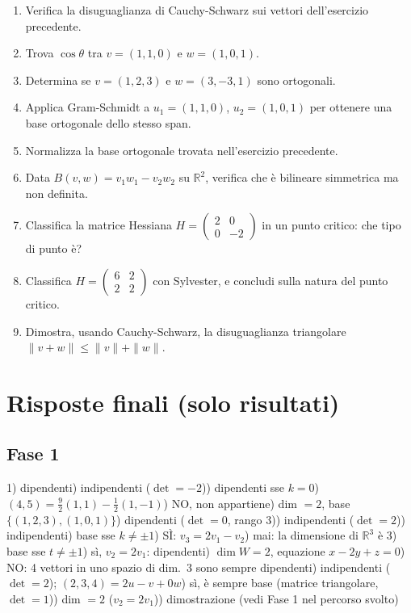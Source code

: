 \documentclass[a4paper,11pt]{article}
\begin{document}
\begin{enumerate}
  \item Verifica la disuguaglianza di Cauchy-Schwarz sui vettori dell'esercizio precedente.
  \item Trova $\cos\theta$ tra $v=(1,1,0)$ e $w=(1,0,1)$.
  \item Determina se $v=(1,2,3)$ e $w=(3,-3,1)$ sono ortogonali.
  \item Applica Gram-Schmidt a $u_1=(1,1,0)$, $u_2=(1,0,1)$ per ottenere una base ortogonale dello stesso span.
  \item Normalizza la base ortogonale trovata nell'esercizio precedente.
  \item Data $B(v,w)=v_1w_1-v_2w_2$ su $\mathbb R^2$, verifica che è bilineare simmetrica ma non definita.
  \item Classifica la matrice Hessiana $H=\begin{pmatrix}2&0\\0&-2\end{pmatrix}$ in un punto critico: che tipo di punto è?
  \item Classifica $H=\begin{pmatrix}6&2\\2&2\end{pmatrix}$ con Sylvester, e concludi sulla natura del punto critico.
  \item Dimostra, usando Cauchy-Schwarz, la disuguaglianza triangolare $\|v+w\|\le\|v\|+\|w\|$.
\end{enumerate}

\newpage
\section*{Risposte finali (solo risultati)}

\subsection*{Fase 1}
\footnotesize
1) dipendenti) indipendenti ($\det=-2$)) dipendenti sse $k=0$) $(4,5)=\tfrac92(1,1)-\tfrac12(1,-1)$) NO, non appartiene) dim $=2$, base $\{(1,2,3),(1,0,1)\}$) dipendenti ($\det=0$, rango 3)) indipendenti ($\det=2$)) indipendenti) base sse $k\neq\pm1$) SÌ: $v_3=2v_1-v_2$) mai: la dimensione di $\mathbb R^3$ è 3) base sse $t\neq\pm1$) sì, $v_2=2v_1$: dipendenti) $\dim W=2$, equazione $x-2y+z=0$) NO: 4 vettori in uno spazio di dim.\ 3 sono sempre dipendenti) indipendenti ($\det=2$); $(2,3,4)=2u-v+0w$) sì, è sempre base (matrice triangolare, $\det=1$)) dim $=2$ ($v_2=2v_1$)) dimostrazione (vedi Fase 1 nel percorso svolto)
\normalsize
\end{document}

